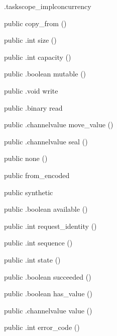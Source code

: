\begin{CrexxClass}{.taskscope\_impl}{concurrency}
\begin{Members}
    \Factory
      {public}
      {copy\_from}
      {()}

    \Method
      {public}
      {.int}
      {size}
      {()}

    \Method
      {public}
      {.int}
      {capacity}
      {()}

    \Method
      {public}
      {.boolean}
      {mutable}
      {()}

    \Method
      {public}
      {.void}
      {write}
      {}

    \Method
      {public}
      {.binary}
      {read}
      {}

    \Method
      {public}
      {.channelvalue}
      {move\_value}
      {()}

    \Method
      {public}
      {.channelvalue}
      {seal}
      {()}

    \Factory
      {public}
      {none}
      {()}

    \Factory
      {public}
      {from\_encoded}
      {}

    \Factory
      {public}
      {synthetic}
      {}

    \Method
      {public}
      {.boolean}
      {available}
      {()}

    \Method
      {public}
      {.int}
      {request\_identity}
      {()}

    \Method
      {public}
      {.int}
      {sequence}
      {()}

    \Method
      {public}
      {.int}
      {state}
      {()}

    \Method
      {public}
      {.boolean}
      {succeeded}
      {()}

    \Method
      {public}
      {.boolean}
      {has\_value}
      {()}

    \Method
      {public}
      {.channelvalue}
      {value}
      {()}

    \Method
      {public}
      {.int}
      {error\_code}
      {()}


\end{Members}
\end{CrexxClass}
